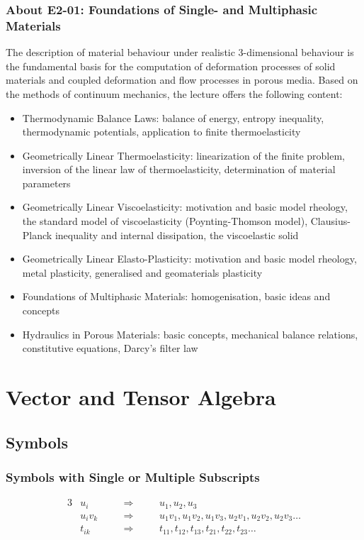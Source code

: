 \documentclass[a5paper,twosided,11pt,DIV=15,BCOR=0mm]{scrbook}
\begin{document}
{\subsection*{About E2-01: Foundations of Single- and Multiphasic Materials}
The description of material behaviour under realistic 3-dimensional behaviour is
the fundamental basis for the computation of deformation processes of solid
materials and coupled deformation and flow processes in porous media. Based on
the methods of continuum mechanics, the lecture offers the following content:
%
\begin{itemize}
\item Thermodynamic Balance Laws: balance of energy, entropy inequality,
  thermodynamic potentials, application to finite thermoelasticity
\item Geometrically Linear Thermoelasticity: linearization of the finite
  problem, inversion of the linear law of thermoelasticity, determination of
  material parameters
\item Geometrically Linear Viscoelasticity: motivation and basic model rheology,
  the standard model of viscoelasticity (Poynting-Thomson model),
  Clausius-Planck inequality and internal dissipation, the viscoelastic solid
\item Geometrically Linear Elasto-Plasticity: motivation and basic model
  rheology, metal plasticity, generalised and geomaterials plasticity
\item Foundations of Multiphasic Materials: homogenisation, basic ideas and
  concepts
\item Hydraulics in Porous Materials: basic concepts, mechanical balance
  relations, constitutive equations, Darcy’s filter law
\end{itemize}
}
\chapter{Vector and Tensor Algebra}
\section{Symbols}
\subsection{Symbols with Single or Multiple Subscripts}
\begin{alignat}{3}
\nonumber&u_i         && \Rightarrow && u_1, u_2, u_3 \\
         &u_iv_k \quad&& \Rightarrow \quad&& u_1v_1, u_1v_2, u_1v_3, u_2v_1, u_2v_2, u_2v_3 \ldots \\
\nonumber&t_{ik}      && \Rightarrow && t_{11}, t_{12}, t_{13}, t_{21}, t_{22}, t_{23} \ldots
\end{alignat}
%
\end{document}
